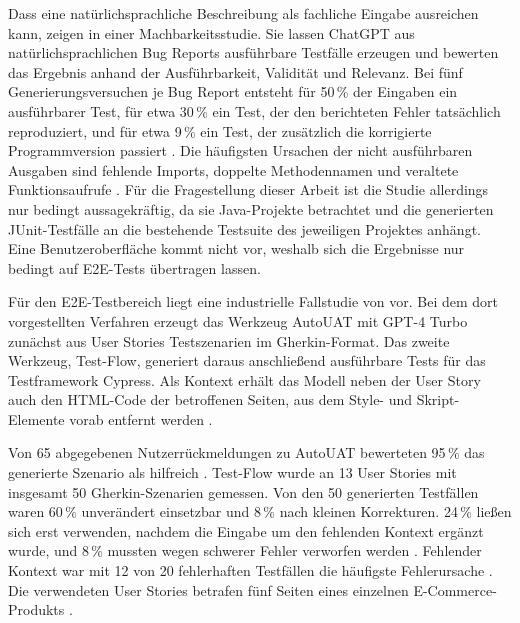 Dass eine natürlichsprachliche Beschreibung als fachliche Eingabe ausreichen kann, zeigen \textcite{plein_automatic_2023} in einer Machbarkeitsstudie. Sie lassen ChatGPT aus natürlichsprachlichen Bug Reports ausführbare Testfälle erzeugen und bewerten das Ergebnis anhand der Ausführbarkeit, Validität und Relevanz. Bei fünf Generierungsversuchen je Bug Report entsteht für 50\,\% der Eingaben ein ausführbarer Test, für etwa 30\,\% ein Test, der den berichteten Fehler tatsächlich reproduziert, und für etwa 9\,\% ein Test, der zusätzlich die korrigierte Programmversion passiert \parencite[S.~5]{plein_automatic_2023}. Die häufigsten Ursachen der nicht ausführbaren Ausgaben sind fehlende Imports, doppelte Methodennamen und veraltete Funktionsaufrufe \parencite[S.~10]{plein_automatic_2023}. Für die Fragestellung dieser Arbeit ist die Studie allerdings nur bedingt aussagekräftig, da sie Java-Projekte betrachtet und die generierten JUnit-Testfälle an die bestehende Testsuite des jeweiligen Projektes anhängt. Eine Benutzeroberfläche kommt nicht vor, weshalb sich die Ergebnisse nur bedingt auf \ac{E2E}-Tests übertragen lassen.

Für den \ac{E2E}-Testbereich liegt eine industrielle Fallstudie von \textcite{ferreira_acceptance_2025} vor. Bei dem dort vorgestellten Verfahren erzeugt das Werkzeug AutoUAT mit GPT-4 Turbo zunächst aus User Stories Testszenarien im Gherkin-Format. Das zweite Werkzeug, Test-Flow, generiert daraus anschließend ausführbare Tests für das Testframework Cypress. Als Kontext erhält das Modell neben der User Story auch den \ac{HTML}-Code der betroffenen Seiten, aus dem Style- und Skript-Elemente vorab entfernt werden \parencite[S.~2f]{ferreira_acceptance_2025}.

Von 65 abgegebenen Nutzerrückmeldungen zu AutoUAT bewerteten 95\,\% das generierte Szenario als hilfreich \parencite[S.~4]{ferreira_acceptance_2025}. Test-Flow wurde an 13 User Stories mit insgesamt 50 Gherkin-Szenarien gemessen. Von den 50 generierten Testfällen waren 60\,\% unverändert einsetzbar und 8\,\% nach kleinen Korrekturen. 24\,\% ließen sich erst verwenden, nachdem die Eingabe um den fehlenden Kontext ergänzt wurde, und 8\,\% mussten wegen schwerer Fehler verworfen werden \parencite[S.~6]{ferreira_acceptance_2025}. Fehlender Kontext war mit 12 von 20 fehlerhaften Testfällen die häufigste Fehlerursache \parencite[S.~5]{ferreira_acceptance_2025}. Die verwendeten User Stories betrafen fünf Seiten eines einzelnen E-Commerce-Produkts \parencite[S.~5]{ferreira_acceptance_2025}.

